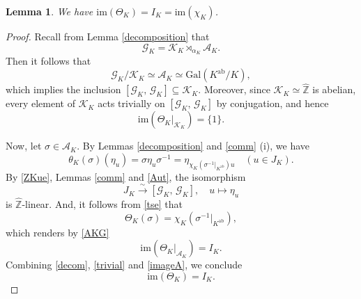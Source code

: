 \documentclass[reqno,11pt]{article}
\theoremstyle{plain} %
\newtheorem{lemma}[theorem]{\indent\sc Lemma}
\theoremstyle{definition} %
\begin{document}
\begin{lemma}\label{iTIK}
We have $\mathrm{im}(\Theta_K)=I_K=\mathrm{im}(\chi_K)$.
\end{lemma}
\begin{proof}
Recall from Lemma \ref{decomposition} that 
\begin{equation}\label{decom}
\mathcal{G}_K=\mathcal{K}_K\rtimes_{\alpha_K}\mathcal{A}_K.
\end{equation}
Then it follows that
\begin{equation*}
\mathcal{G}_K/\mathcal{K}_K\simeq\mathcal{A}_K\simeq
\mathrm{Gal}(K^\mathrm{ab}/K),
\end{equation*}
which implies the inclusion $[\mathcal{G}_K,\,\mathcal{G}_K]\subseteq\mathcal{K}_K$. 
Moreover, since $\mathcal{K}_K\simeq\widehat{\mathbb{Z}}$ is abelian, 
every element of $\mathcal{K}_K$ acts trivially on $[\mathcal{G}_K,\,\mathcal{G}_K]$ by conjugation, and hence
\begin{equation}\label{trivial}
\mathrm{im}(\Theta_K|_{\mathcal{K}_K})=\{1\}.
\end{equation}
\par
Now, let $\sigma\in\mathcal{A}_K$. By Lemmas \ref{decomposition} and \ref{comm} (i), we have
\begin{equation}\label{tse}
\theta_K(\sigma)(\eta_u)
 =\sigma\eta_u\sigma^{-1}
 =\eta_{\chi_K(\sigma^{-1}|_{K^\mathrm{ab}})u}\quad(u\in J_K).
\end{equation}
By \eqref{ZKue}, Lemmas \ref{comm} and \ref{Aut}, the isomorphism
\begin{equation*}
J_K\stackrel{\sim}{\rightarrow}[\mathcal{G}_K,\,\mathcal{G}_K],\quad u\mapsto\eta_u
\end{equation*}
is $\widehat{\mathbb Z}$-linear. 
And, it follows from \eqref{tse} that
\begin{equation*}
\Theta_K(\sigma)=\chi_K(\sigma^{-1}|_{K^\mathrm{ab}}),
\end{equation*}
which renders by \eqref{AKG} 
\begin{equation}\label{imageA}
\mathrm{im}(\Theta_K|_{\mathcal{A}_K})=I_K.
\end{equation}
Combining \eqref{decom}, \eqref{trivial} and \eqref{imageA}, we conclude
\begin{equation*}
\mathrm{im}(\Theta_K)=I_K.
\end{equation*}
\end{proof}
\end{document}
